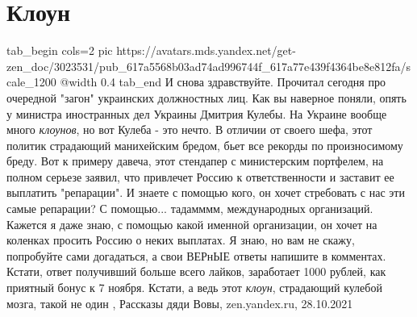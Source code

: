  
 
 
 
 
\chapter{Клоун}
\label{sec:slova.kloun}

\ifcmt
  tab_begin cols=2
     pic https://avatars.mds.yandex.net/get-zen_doc/3023531/pub_617a5568b03ad74ad996744f_617a77e439f4364be8e812fa/scale_1200
		 @width 0.4
  tab_end
\fi
И снова здравствуйте. Прочитал сегодня про очередной "загон" украинских
должностных лиц. Как вы наверное поняли, опять у министра иностранных дел
Украины Дмитрия Кулебы. На Украине вообще много \emph{клоунов}, но вот Кулеба - это
нечто.  В отличии от своего шефа, этот политик страдающий манихейским бредом,
бьет все рекорды по произносимому бреду. Вот к примеру давеча, этот стендапер с
министерским портфелем, на полном серьезе заявил, что привлечет Россию к
ответственности и заставит ее выплатить "репарации".  И знаете с помощью кого,
он хочет стребовать с нас эти самые репарации? С помощью... тадамммм,
международных организаций. Кажется я даже знаю, с помощью какой именной
организации, он хочет на коленках просить Россию о неких выплатах. Я знаю, но
вам не скажу, попробуйте сами догадаться, а свои ВЕРнЫЕ ответы напишите в
комментах. Кстати, ответ получивший больше всего лайков, заработает 1000
рублей, как приятный бонус к 7 ноября.  Кстати, а ведь этот \emph{клоун}, страдающий
кулебой мозга, такой не один
, 
Рассказы дяди Вовы, zen.yandex.ru, 28.10.2021
